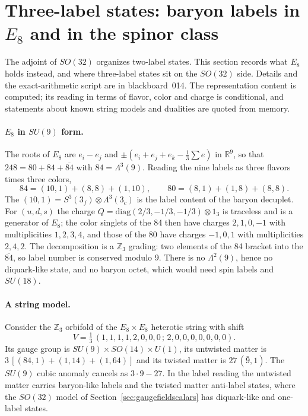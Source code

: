 \section{Three-label states: baryon labels in \texorpdfstring{$E_8$}{E8} and in the spinor class}
\label{sec:threelabel}
The adjoint of $SO(32)$ organizes two-label states. This section records
what $E_8$ holds instead, and where three-label states sit on the
$SO(32)$ side. Details and the exact-arithmetic script are in
blackboard~014. The representation content is computed; its reading in
terms of flavor, color and charge is conditional, and statements about
known string models and dualities are quoted from memory.

\paragraph{$E_8$ in $SU(9)$ form.}
The roots of $E_8$ are $e_i-e_j$ and
$\pm(e_i+e_j+e_k-\tfrac13\sum e)$ in $\mathbb R^9$, so that
$248=80+84+\overline{84}$ with $84=\Lambda^3(9)$. Reading the nine
labels as three flavors times three colors,
\begin{equation}
84=(10,1)+(8,8)+(1,10),\qquad 80=(8,1)+(1,8)+(8,8).
\end{equation}
The $(10,1)=S^3(3_f)\otimes\Lambda^3(3_c)$ is the label content of the
baryon decuplet. For $(u,d,s)$ the charge
$Q=\mathrm{diag}(2/3,-1/3,-1/3)\otimes1_3$ is traceless and is a
generator of $E_8$; the color singlets of the 84 then have charges
$2,1,0,-1$ with multiplicities $1,2,3,4$, and those of the 80 have
charges $-1,0,1$ with multiplicities $2,4,2$. The decomposition is a
$\mathbb Z_3$ grading: two elements of the 84 bracket into the
$\overline{84}$, so label number is conserved modulo 9. There is no
$\Lambda^2(9)$, hence no diquark-like state, and no baryon octet, which
would need spin labels and $SU(18)$.

\paragraph{A string model.}
Consider the $\mathbb Z_3$ orbifold of the $E_8\times E_8$ heterotic
string with shift
\begin{equation}
V=\tfrac13\,(1,1,1,1,2,0,0,0\,;\,2,0,0,0,0,0,0,0).
\end{equation}
Its gauge group is $SU(9)\times SO(14)\times U(1)$, its untwisted matter
is $3\,[(84,1)+(1,14)+(1,64)]$ and its twisted matter is
$27\,(\bar9,1)$. The $SU(9)$ cubic anomaly cancels as $3\cdot9-27$. In the label reading the
untwisted matter carries baryon-like labels and the twisted matter
anti-label states, where the $SO(32)$ model of
Section~\ref{sec:gaugefieldscalars} has diquark-like and one-label
states.

